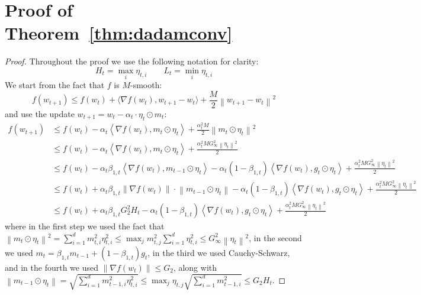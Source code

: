 \documentclass{article}
\newcommand{\norm}[1]{\left\lVert{#1}\right\rVert}
\newcommand{\thmref}[1]{Theorem~\ref{#1}}
\newcommand{\currw}{w_t}
\newcommand{\nextw}{w_{t+1}}
\newcommand{\currg}{g_t}
\newcommand{\prevm}{m_{t-1}}
\newcommand{\currm}{m_t}
\newcommand{\curre}{\eta_t}
\newcommand{\currei}{\eta_{t,i}}
\newcommand{\curra}{\alpha_t}
\newcommand{\normed}[1]{\left\lVert {#1} \right\rVert}
\newcommand{\bonet}{\beta_{1,t}}
\newcommand{\smooth}{M}
\newcommand{\lowinft}{L_{t}}
\newcommand{\highinft}{H_{t}}
\newcommand{\gradb}{G_\infty}
\newcommand{\gradbtwo}{G_2}
\begin{document}
\section{Proof of \thmref{thm:dadamconv}}
\label{sec:proof2}

\begin{proof}

Throughout the proof we use the following notation for clarity: 
\begin{equation}
	\highinft = \max_i \currei \quad\quad \lowinft = \min_i \currei
\end{equation}
We start from the fact that $f$ is $\smooth$-smooth:
\begin{equation}
   f(\nextw) \leq
      f(\currw) +
      \langle \nabla f(\currw), \nextw - \currw \rangle +
      \frac{\smooth}2 \normed{\nextw - \currw}^2
\end{equation}
and use the update $\nextw = \currw - \curra \cdot \curre \odot \currm$:
\begin{equation}
\begin{split}
   f(\nextw) & \leq f(\currw) - \curra \left\langle \nabla f(\currw), \currm \odot \curre \right\rangle + \frac{\curra^2 \smooth}2 \normed{ \currm \odot \curre}^2 \\
   &\leq f(\currw) - \curra \left\langle \nabla f(\currw), \currm \odot \curre \right\rangle + \frac{\curra^2 \smooth \gradb^2 \norm{\curre}^2}2 \\
   &\leq f(\currw) - \curra \bonet \left\langle \nabla f(\currw), \prevm \odot \curre \right\rangle - \curra (1 - \bonet) \left\langle \nabla f(\currw), \currg \odot \curre \right\rangle + \frac{\curra^2 \smooth \gradb^2 \norm{\curre}^2}2 \\
   &\leq f(\currw) + \curra \bonet \normed{\nabla f(\currw)} \cdot \normed{\prevm \odot \curre} - \curra (1 - \bonet) \left\langle \nabla f(\currw), \currg \odot \curre \right\rangle + \frac{\curra^2 \smooth \gradb^2 \norm{\curre}^2}2 \\
   &\leq f(\currw) + \curra \bonet \gradbtwo^2 \highinft - \curra (1 - \bonet) \left\langle \nabla f(\currw), \currg \odot \curre \right\rangle + \frac{\curra^2 \smooth \gradb^2 \norm{\curre}^2}2
\end{split}
\end{equation}
where in the first step we used the fact that
$\normed{ \currm \odot \curre}^2 = \sum_{i=1}^d m_{t,i}^2 \currei^2 \leq \max_j m_{t,j}^2 \sum_{i=1}^d \eta_{t,i}^2 \leq \gradb^2 \normed{\curre}^2$,
in the second we used
$\currm = \bonet \prevm + (1-\bonet) \currg$,
in the third we used Cauchy-Schwarz,
and in the fourth we used $\normed{\nabla f(\currw)} \leq \gradbtwo$, along with
$\normed{ \prevm \odot \curre} = \sqrt{\sum_{i=1}^d m_{t-1,i}^2 \currei^2} \leq \max_j \eta_{t,j} \sqrt{\sum_{i=1}^d m_{t-1,i}^2} \leq \gradbtwo \highinft$.


\end{proof}
\end{document}
